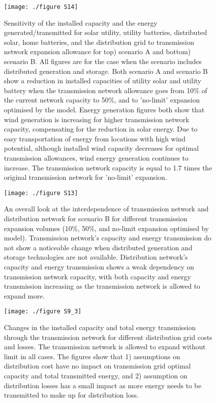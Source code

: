 	\begin{figure}[H]
		\renewcommand*{\thefigure}{S\arabic{figure}}
		
		\texttt{[image: ./figure S14]}   %
		\caption{Sensitivity of the installed capacity and the energy generated/transmitted for solar utility, utility batteries, distributed solar, home batteries, and the distribution grid to transmission network expansion allowance for top) scenario A and bottom) scenario B. All figures are for the case when the scenario includes distributed generation and storage. Both scenario A and scenario B show a reduction in installed capacities of utility solar and utility battery when the transmission network allowance goes from 10\% of the current network capacity to 50\%, and to 'no-limit' expansion optimised by the model. Energy generation figures both show that wind generation is increasing for higher transmission network capacity, compensating for the reduction in solar energy. Due to easy transportation of energy from locations with high wind potential, although installed wind capacity decreases for optimal transmission allowances, wind energy generation continues to increase. The transmission network capacity is equal to 1.7 times the original transmission network for 'no-limit' expansion. }
	\end{figure}
	
	\begin{figure}[H]
		\renewcommand*{\thefigure}{S\arabic{figure}}
		
		\texttt{[image: ./figure S13]}   %
		\caption{An overall look at the interdependence of transmission network and distribution network for scenario B for different transmission expansion volumes (10\%, 50\%, and no-limit expansion optimised by model). Transmission network's capacity and energy transmission do not show a noticeable change when distributed generation and storage technologies are not available. Distribution network's capacity and energy transmission shows a weak dependency on transmission network capacity, with both capacity and energy transmission increasing as the transmission network is allowed to expand more.}
	\end{figure}
	
	\begin{figure}[H]
		\renewcommand*{\thefigure}{S\arabic{figure}}
		
		\texttt{[image: ./figure S9\_3]}   %
		\caption{Changes in the installed capacity and total energy transmission through the transmission network for different distribution grid costs and losses. The transmission network is allowed to expand without limit in all cases. The figures show that 1) assumptions on distribution cost have no impact on transmission grid optimal capacity and total transmitted energy, and 2) assumption on distribution losses has a small impact as more energy needs to be transmitted to make up for distribution loss. 
		}
	\end{figure}
	
